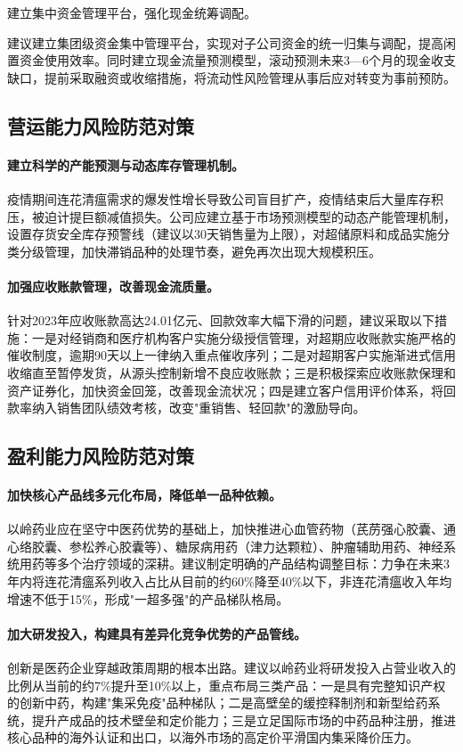 \documentclass[12pt,a4paper,fontset=windows,UTF8]{ctexart}
\begin{document}
建立集中资金管理平台，强化现金统筹调配。

建议建立集团级资金集中管理平台，实现对子公司资金的统一归集与调配，提高闲置资金使用效率。同时建立现金流量预测模型，滚动预测未来3—6个月的现金收支缺口，提前采取融资或收缩措施，将流动性风险管理从事后应对转变为事前预防。

\subsection{营运能力风险防范对策}
\paragraph*{建立科学的产能预测与动态库存管理机制。}
疫情期间连花清瘟需求的爆发性增长导致公司盲目扩产，疫情结束后大量库存积压，被迫计提巨额减值损失。公司应建立基于市场预测模型的动态产能管理机制，设置存货安全库存预警线（建议以30天销售量为上限），对超储原料和成品实施分类分级管理，加快滞销品种的处理节奏，避免再次出现大规模积压。

\paragraph*{加强应收账款管理，改善现金流质量。}
针对2023年应收账款高达24.01亿元、回款效率大幅下滑的问题，建议采取以下措施：一是对经销商和医疗机构客户实施分级授信管理，对超期应收账款实施严格的催收制度，逾期90天以上一律纳入重点催收序列；二是对超期客户实施渐进式信用收缩直至暂停发货，从源头控制新增不良应收账款；三是积极探索应收账款保理和资产证券化，加快资金回笼，改善现金流状况；四是建立客户信用评价体系，将回款率纳入销售团队绩效考核，改变"重销售、轻回款"的激励导向。

\subsection{盈利能力风险防范对策}
\paragraph*{加快核心产品线多元化布局，降低单一品种依赖。}
以岭药业应在坚守中医药优势的基础上，加快推进心血管药物（芪苈强心胶囊、通心络胶囊、参松养心胶囊等）、糖尿病用药（津力达颗粒）、肿瘤辅助用药、神经系统用药等多个治疗领域的深耕。建议制定明确的产品结构调整目标：力争在未来3年内将连花清瘟系列收入占比从目前的约60\%降至40\%以下，非连花清瘟收入年均增速不低于15\%，形成"一超多强"的产品梯队格局。

\paragraph*{加大研发投入，构建具有差异化竞争优势的产品管线。}
创新是医药企业穿越政策周期的根本出路。建议以岭药业将研发投入占营业收入的比例从当前的约7\%提升至10\%以上，重点布局三类产品：一是具有完整知识产权的创新中药，构建"集采免疫"品种梯队；二是高壁垒的缓控释制剂和新型给药系统，提升产成品的技术壁垒和定价能力；三是立足国际市场的中药品种注册，推进核心品种的海外认证和出口，以海外市场的高定价平滑国内集采降价压力。
\end{document}
